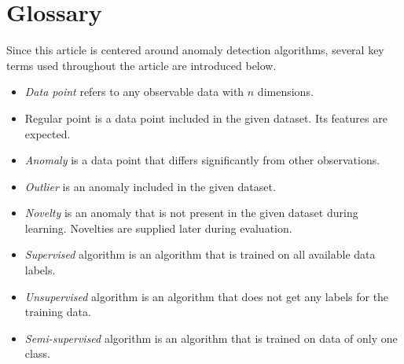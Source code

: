 \section{Glossary}
\label{sec:theory}

Since this article is centered around anomaly detection algorithms, several key terms used throughout the article are introduced below.

\begin{itemize}
    \item \emph{Data point} refers to any observable data with \(n\) dimensions.
\item Regular point is a data point included in the given dataset. Its features are expected.
\item \emph{Anomaly} is a data point that differs significantly from other observations.
\item \emph{Outlier} is an anomaly included in the given dataset.
\item \emph{Novelty} is an anomaly that is not present in the given dataset during learning. Novelties are supplied later during evaluation.
\item \emph{Supervised} algorithm is an algorithm that is trained on all available data labels.
\item \emph{Unsupervised} algorithm is an algorithm that does not get any labels for the training data.
\item \emph{Semi-supervised} algorithm is an algorithm that is trained on data of only one class.

\end{itemize}